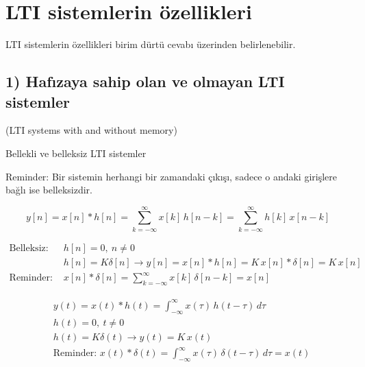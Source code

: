 \documentclass[11pt,a4paper]{article}
\begin{document}
\section{LTI sistemlerin özellikleri}
LTI sistemlerin özellikleri birim dürtü cevabı üzerinden belirlenebilir.

\subsection{1) Hafızaya sahip olan ve olmayan LTI sistemler}
(LTI systems with and without memory)

\noindent
\begin{minipage}[t]{0.5\linewidth}
Bellekli ve belleksiz LTI sistemler
\end{minipage}\hfill
\begin{minipage}[t]{0.47\linewidth}
\small Reminder: Bir sistemin herhangi bir zamandaki çıkışı, sadece o andaki girişlere bağlı ise belleksizdir.
\end{minipage}
\[ y[n] = x[n] \ast h[n] = \sum_{k=-\infty}^{\infty} x[k]\,h[n-k] = \sum_{k=-\infty}^{\infty} h[k]\,x[n-k] \]
\noindent
\begin{minipage}[c]{0.7\linewidth}
\begin{align*}
  \text{Belleksiz: } & h[n] = 0, \ n \neq 0 \\
  & h[n] = K\delta[n] \longrightarrow y[n] = x[n] \ast h[n] = K\,x[n] \ast \delta[n] = K\,x[n] \\
  \text{Reminder: } & x[n] \ast \delta[n] = \sum_{k=-\infty}^{\infty} x[k]\,\delta[n-k] = x[n]
\end{align*}
\end{minipage}\hfill
\begin{minipage}[c]{0.27\linewidth}
\end{minipage}

\begin{align*}
  & y(t) = x(t) \ast h(t) = \int_{-\infty}^{\infty} x(\tau)\,h(t-\tau)\,d\tau \\
  & h(t) = 0, \ t \neq 0 \\
  & h(t) = K\delta(t) \longrightarrow y(t) = K\,x(t) \\
  & \text{Reminder: } x(t) \ast \delta(t) = \int_{-\infty}^{\infty} x(\tau)\,\delta(t-\tau)\,d\tau = x(t)
\end{align*}
\end{document}
